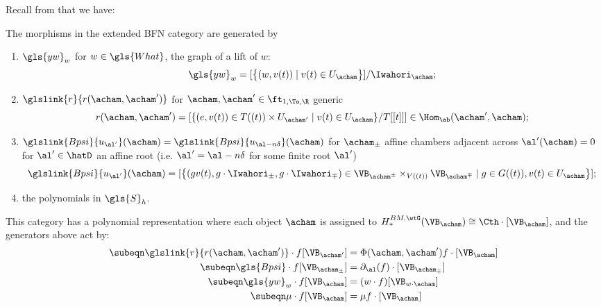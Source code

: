 Recall from \cite[Thm. 3.7]{WebSD} that we have:
\begin{theorem}\label{thm:BFN-pres}
  The morphisms in the extended BFN category are generated by
  \begin{enumerate}
  \item $\gls{yw}_w$ for $w\in \gls{What}$, the graph of a lift of $w$:
\begin{equation*}
\gls{yw}_w=[\big\{(w,v(t))\mid v(t)\in
U_\acham\big\}]/\Iwahori_\acham;\label{eq:y-def}
\end{equation*}
  \item $\glslink{r}{r(\acham,\acham')}$ for $\acham,\acham'\in \ft_{1,\To,\R}$
    generic
\begin{equation*}
r(\acham,\acham')=\left[\{(e,v(t)) \in T((t))\times U_{\acham'}\mid v(t)\in
U_{\acham}\}/T[[t]]\right]\in \Hom_{\ab}(\acham',\acham) ;\label{eq:r-def}
\end{equation*}
  \item $\glslink{Bpsi}{u_{\al'}}(\acham)=\glslink{Bpsi}{u_{\al-n\delta}}(\acham)$ for
    $\acham_\pm$ affine chambers adjacent across $\al'(\acham)=0$ for
    $\al'\in \hatD$ an affine root (i.e. $\al'=\al-n\delta$ for some
    finite root $\al'$)
\begin{equation*}
\glslink{Bpsi}{u_{\al'}}(\acham)=[{\left\{(gv(t),g \cdot\Iwahori_{\pm} ,g\cdot \Iwahori_{\mp})\in \VB_{\acham^\pm}\times_{V((t))}\VB_{\acham^{\mp}}
  \mid g\in
  G((t)), v(t)\in U_\acham\right\}}];\label{eq:psi-def}
\end{equation*}
  \item the polynomials in $\gls{S}_h$.
  \end{enumerate}
  This category has a polynomial representation where each object $\acham$ is assigned to $H_*^{BM,\wtG}(\VB_{\acham})\cong \Cth\cdot [\VB_{\acham}]$, and the generators above act by:
  \newseq \begin{align*}
\subeqn\label{eq:ract} 
\glslink{r}{r(\acham,\acham')} \cdot f [\VB_{\acham'}]&=\Phi(\acham,\acham') f\cdot
                                           [\VB_{\acham}]\\
  \subeqn\label{eq:psiact}
\gls{Bpsi}\cdot f[\VB_{\acham_{\pm}}]&=\partial_{\al}(f)\cdot [\VB_{\acham_{\mp}}]\\
   \subeqn\label{eq:wact} \gls{yw}_w\cdot f[\VB_{\acham}]&=(w\cdot f)[\VB_{w\cdot \acham}]\\
     \subeqn\label{eq:muact}
\mu \cdot f [\VB_{\acham}]&=\mu f\cdot [\VB_{\acham}]
  \end{align*} \newseq 

\end{theorem}
